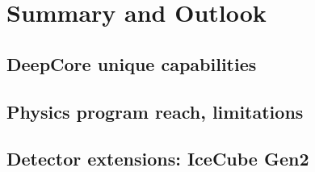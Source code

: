 \documentclass[../Main.tex]{subfiles}
\begin{document}
       {}       {}
    {}    {}
 {} {}


\graphicspath{{figures/}{Outlook/figures/}}


\section{Summary and Outlook}

\subsection{DeepCore unique capabilities}

\subsection{Physics program reach, limitations}

\subsection{Detector extensions: IceCube Gen2}
\end{document}

